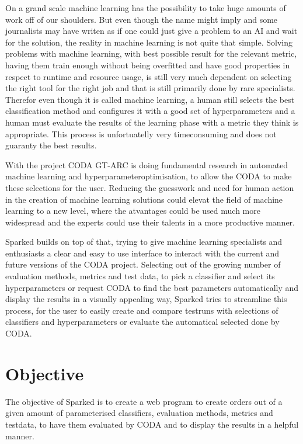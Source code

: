\documentclass[12pt,a4paper,titlepage,oneside,BCOR1cm]{scrreprt}
\begin{document}
On a grand scale machine learning has the possibility to take huge amounts of work off of our shoulders. 
But even though the name might imply and some journalists may have writen as if one could just give a problem to an AI and wait for the solution, the reality in machine learning is not quite that simple.
Solving problems with machine learning, with best possible result for the relevant metric, having them train enough without being overfitted and have good properties in respect to runtime and resource usage, is still very much dependent on selecting the right tool for the right job and that is still primarily done by rare specialists. 
Therefor even though it is called machine learning, a human still selects the best classification method and configures it with a good set of hyperparameters and a human must evaluate the results of the learning phase with a metric they think is appropriate.
This process is unfortuatelly very timeconsuming and does not guaranty the best results.

With the project CODA GT-ARC is doing fundamental research in automated machine learning and hyperparameteroptimisation, to allow the CODA to make these selections for the user. 
Reducing the guesswork and need for human action in the creation of machine learning solutions could elevat the field of machine learning to a new level, where the atvantages could be used much more widespread and the experts could use their talents in a more productive manner.

Sparked builds on top of that, trying to give machine learning specialists and enthusiasts a clear and easy to use interface to interact with the current and future versions of the CODA project. 
Selecting out of the growing number of evaluation methods, metrics and test data, to pick a classifier and select its hyperparameters or request CODA to find the best parameters automatically and display the results in a visually appealing way, Sparked tries to streamline this process, for the user to easily create and compare testruns with selections of classifiers and hyperparameters or evaluate the automatical selected done by CODA.

\chapter{Objective}
The objective of Sparked is to create a web program to create orders out of a given amount of parameterised classifiers, evaluation methods, metrics and testdata, to have them evaluated by CODA and to display the results in a helpful manner.
\end{document}

